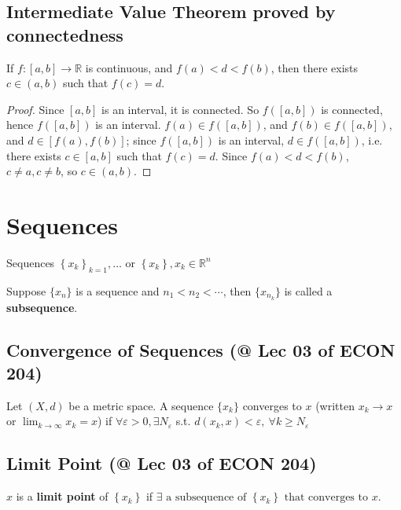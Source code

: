 \documentclass[11pt]{elegantbook}
\begin{document}
\subsection{Intermediate Value Theorem proved by connectedness}
\begin{corollary}
    If $f : [a, b] \rightarrow \mathbb{R}$ is continuous, and $f(a) < d < f(b)$, then there exists $c \in (a, b)$ such that $f(c) = d$.
\end{corollary}
\begin{proof}
    Since $[a, b]$ is an interval, it is connected. So $f([a, b])$ is connected, hence $f([a, b])$ is an interval. $f(a) \in f([a, b])$, and $f(b) \in f([a, b])$, and $d \in [f(a), f(b)]$; since $f([a, b])$ is an interval, $d \in f([a, b])$, i.e. there exists $c \in [a, b]$ such that $f(c) = d$. Since $f(a) < d < f(b)$, $c \neq a, c \neq b$, so $c \in (a, b)$.
\end{proof}


\section{Sequences}
Sequences $\left\{x_{k}\right\}_{k=1}, \ldots$ or $\left\{x_{k}\right\}, x_{k} \in \mathbb{R}^{n}$

\begin{definition}[Subsequence]
\normalfont
    Suppose $\{x_n\}$ is a sequence and $n_1<n_2<\cdots$, then $\{x_{n_k}\}$ is called a \textbf{subsequence}.
\end{definition}

\subsection{Convergence of Sequences \small{(@ Lec 03 of ECON 204)}}
\begin{definition}[Convergence: note $x_{k} \rightarrow x, \lim _{k \rightarrow \infty} x_{k}=x$]
    Let $(X, d)$ be a metric space. A sequence $\{x_k\}$ converges to $x$ (written $x_{k} \rightarrow x$ or $\lim _{k \rightarrow \infty} x_{k}=x$) if $\forall \varepsilon>0, \exists N_{\varepsilon}$ s.t. $d(x_{k},x)<\varepsilon,\ \forall k \geqslant N_{\varepsilon}$
\end{definition}

\subsection{Limit Point \small{(@ Lec 03 of ECON 204)}}
\begin{definition}
    \normalfont $x$ is a \textbf{limit point} of $\left\{x_{k}\right\}$ if $\exists \text { a subsequence of }\left\{x_{k}\right\} \text { that converges to } x$.
\end{definition}
\end{document}
